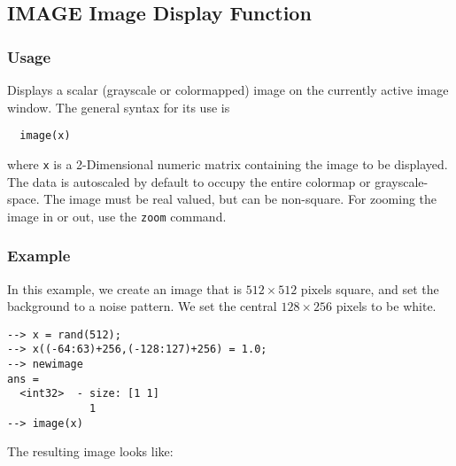 %
%
%
\subsection{IMAGE Image Display Function}
\subsubsection{Usage}
Displays a scalar (grayscale or colormapped) image on the 
currently active image window.  The general syntax for its use is
\begin{verbatim}
  image(x)
\end{verbatim}
where \verb|x| is a 2-Dimensional numeric matrix containing the
image to be displayed.  The data is autoscaled by default to occupy
the entire colormap or grayscale-space.  The image must be real valued,
but can be non-square.  For zooming the image in or out, use the
\verb|zoom| command.
\subsubsection{Example}
In this example, we create an image that is $512 \times 512$ pixels
square, and set the background to a noise pattern.  We set the central
$128 \times 256$ pixels to be white.
\begin{verbatim}
--> x = rand(512);
--> x((-64:63)+256,(-128:127)+256) = 1.0;
--> newimage
ans =
  <int32>  - size: [1 1]
             1
--> image(x)
\end{verbatim}

The resulting image looks like:

